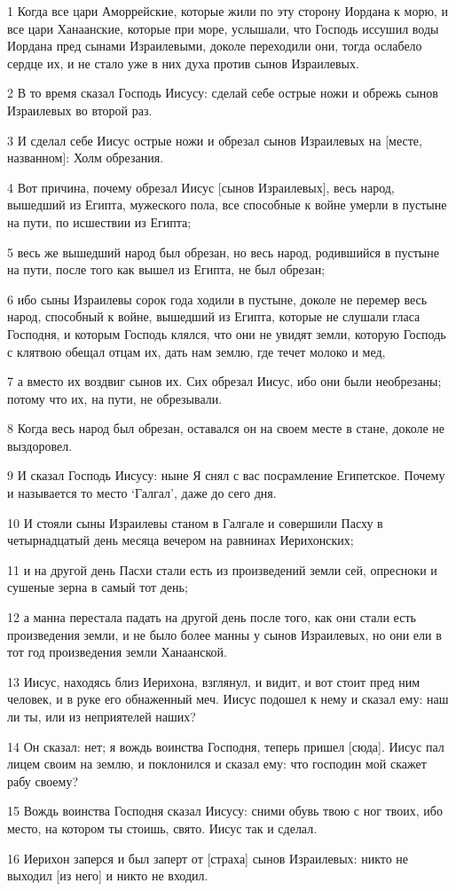 \par 1 Когда все цари Аморрейские, которые жили по эту сторону Иордана к морю, и все цари Ханаанские, которые при море, услышали, что Господь иссушил воды Иордана пред сынами Израилевыми, доколе переходили они, тогда ослабело сердце их, и не стало уже в них духа против сынов Израилевых.
\par 2 В то время сказал Господь Иисусу: сделай себе острые ножи и обрежь сынов Израилевых во второй раз.
\par 3 И сделал себе Иисус острые ножи и обрезал сынов Израилевых на [месте, названном]: Холм обрезания.
\par 4 Вот причина, почему обрезал Иисус [сынов Израилевых], весь народ, вышедший из Египта, мужеского пола, все способные к войне умерли в пустыне на пути, по исшествии из Египта;
\par 5 весь же вышедший народ был обрезан, но весь народ, родившийся в пустыне на пути, после того как вышел из Египта, не был обрезан;
\par 6 ибо сыны Израилевы сорок года ходили в пустыне, доколе не перемер весь народ, способный к войне, вышедший из Египта, которые не слушали гласа Господня, и которым Господь клялся, что они не увидят земли, которую Господь с клятвою обещал отцам их, дать нам землю, где течет молоко и мед,
\par 7 а вместо их воздвиг сынов их. Сих обрезал Иисус, ибо они были необрезаны; потому что их, на пути, не обрезывали.
\par 8 Когда весь народ был обрезан, оставался он на своем месте в стане, доколе не выздоровел.
\par 9 И сказал Господь Иисусу: ныне Я снял с вас посрамление Египетское. Почему и называется то место `Галгал', даже до сего дня.
\par 10 И стояли сыны Израилевы станом в Галгале и совершили Пасху в четырнадцатый день месяца вечером на равнинах Иерихонских;
\par 11 и на другой день Пасхи стали есть из произведений земли сей, опресноки и сушеные зерна в самый тот день;
\par 12 а манна перестала падать на другой день после того, как они стали есть произведения земли, и не было более манны у сынов Израилевых, но они ели в тот год произведения земли Ханаанской.
\par 13 Иисус, находясь близ Иерихона, взглянул, и видит, и вот стоит пред ним человек, и в руке его обнаженный меч. Иисус подошел к нему и сказал ему: наш ли ты, или из неприятелей наших?
\par 14 Он сказал: нет; я вождь воинства Господня, теперь пришел [сюда]. Иисус пал лицем своим на землю, и поклонился и сказал ему: что господин мой скажет рабу своему?
\par 15 Вождь воинства Господня сказал Иисусу: сними обувь твою с ног твоих, ибо место, на котором ты стоишь, свято. Иисус так и сделал.
\par 16 Иерихон заперся и был заперт от [страха] сынов Израилевых: никто не выходил [из него] и никто не входил.

